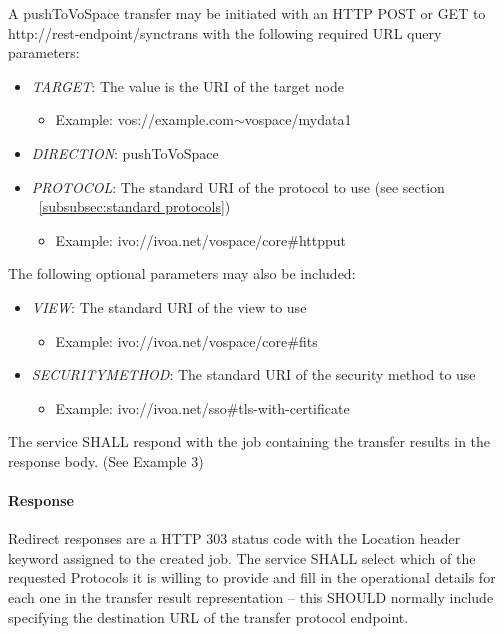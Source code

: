 \documentclass[11pt,a4paper]{ivoa}
\begin{document}
A pushToVoSpace transfer may be initiated with an HTTP POST or GET to http://rest-endpoint/synctrans with the following required URL query parameters:
\begin{itemize}
    \item \emph{TARGET}: The value is the URI of the target node
        \begin{itemize}
           \item Example:  vos://example.com$\mathtt{\sim}$vospace/mydata1
        \end{itemize}
    \item \emph{DIRECTION}: pushToVoSpace
    \item \emph{PROTOCOL}: The standard URI of the protocol to use (see section ~\ref{subsubsec:standard protocols})
        \begin{itemize}
           \item Example: ivo://ivoa.net/vospace/core\#httpput
        \end{itemize}
\end{itemize}

The following optional parameters may also be included:
\begin{itemize}
    \item \emph{VIEW}: The standard URI of the view to use
        \begin{itemize}
           \item Example:  ivo://ivoa.net/vospace/core\#fits
        \end{itemize}
    \item \emph{SECURITYMETHOD}: The standard URI of the security method to use
        \begin{itemize}
           \item Example:  ivo://ivoa.net/sso\#tls-with-certificate
        \end{itemize}
\end{itemize}

The service SHALL respond with the job containing the transfer results in the response body.  (See Example 3)

\paragraph{Response}
Redirect responses are a HTTP 303 status code with the Location header keyword assigned to the created job.
The service SHALL select which of the requested Protocols it is willing to provide and fill in the operational details for each one in the transfer result representation -- this SHOULD normally include specifying the destination URL of the transfer protocol endpoint.
\end{document}
